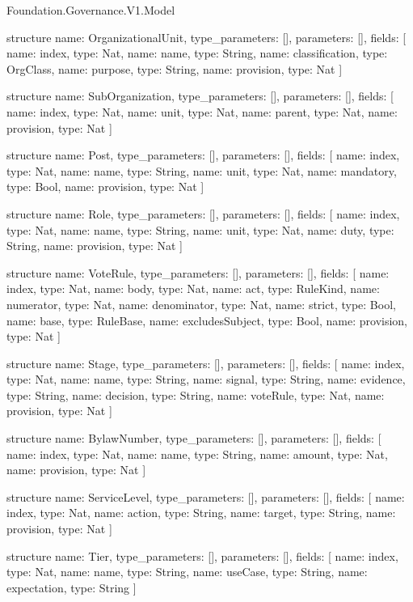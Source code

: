 \begin{lexlean}{Foundation.Governance.V1.Model}
\begin{semanticmodule}
structure{
  name: OrganizationalUnit,
  type_parameters: [],
  parameters: [],
  fields: [
    {name: index, type: Nat},
    {name: name, type: String},
    {name: classification, type: OrgClass},
    {name: purpose, type: String},
    {name: provision, type: Nat}
  ]
}

structure{
  name: SubOrganization,
  type_parameters: [],
  parameters: [],
  fields: [
    {name: index, type: Nat},
    {name: unit, type: Nat},
    {name: parent, type: Nat},
    {name: provision, type: Nat}
  ]
}

structure{
  name: Post,
  type_parameters: [],
  parameters: [],
  fields: [
    {name: index, type: Nat},
    {name: name, type: String},
    {name: unit, type: Nat},
    {name: mandatory, type: Bool},
    {name: provision, type: Nat}
  ]
}

structure{
  name: Role,
  type_parameters: [],
  parameters: [],
  fields: [
    {name: index, type: Nat},
    {name: name, type: String},
    {name: unit, type: Nat},
    {name: duty, type: String},
    {name: provision, type: Nat}
  ]
}

structure{
  name: VoteRule,
  type_parameters: [],
  parameters: [],
  fields: [
    {name: index, type: Nat},
    {name: body, type: Nat},
    {name: act, type: RuleKind},
    {name: numerator, type: Nat},
    {name: denominator, type: Nat},
    {name: strict, type: Bool},
    {name: base, type: RuleBase},
    {name: excludesSubject, type: Bool},
    {name: provision, type: Nat}
  ]
}

structure{
  name: Stage,
  type_parameters: [],
  parameters: [],
  fields: [
    {name: index, type: Nat},
    {name: name, type: String},
    {name: signal, type: String},
    {name: evidence, type: String},
    {name: decision, type: String},
    {name: voteRule, type: Nat},
    {name: provision, type: Nat}
  ]
}

structure{
  name: BylawNumber,
  type_parameters: [],
  parameters: [],
  fields: [
    {name: index, type: Nat},
    {name: name, type: String},
    {name: amount, type: Nat},
    {name: provision, type: Nat}
  ]
}

structure{
  name: ServiceLevel,
  type_parameters: [],
  parameters: [],
  fields: [
    {name: index, type: Nat},
    {name: action, type: String},
    {name: target, type: String},
    {name: provision, type: Nat}
  ]
}

structure{
  name: Tier,
  type_parameters: [],
  parameters: [],
  fields: [
    {name: index, type: Nat},
    {name: name, type: String},
    {name: useCase, type: String},
    {name: expectation, type: String}
  ]
}


\end{semanticmodule}
\end{lexlean}
